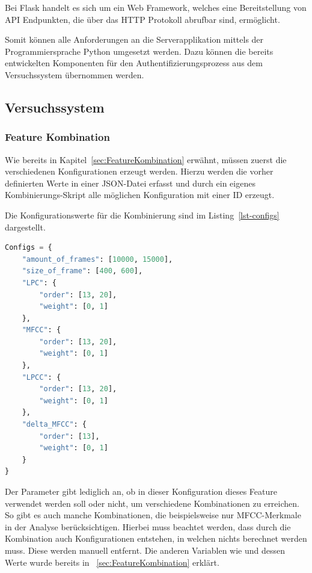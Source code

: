 Bei Flask handelt es sich um ein Web Framework, welches eine Bereitstellung von \ac{API} Endpunkten, die über das \ac{HTTP} Protokoll abrufbar sind, ermöglicht.

Somit können alle Anforderungen an die Serverapplikation mittels der Programmiersprache Python umgesetzt werden.
Dazu können die bereits entwickelten Komponenten für den Authentifizierungsprozess aus dem Versuchssystem übernommen werden.

\subsection{Versuchssystem}\label{sec:UmsetzungVersuchssystem}

\subsubsection{Feature Kombination}

Wie bereits in Kapitel~\ref{sec:FeatureKombination} erwähnt, müssen zuerst die verschiedenen Konfigurationen erzeugt werden.
Hierzu werden die vorher definierten Werte in einer JSON-Datei erfasst und durch ein eigenes Kombinierungs-Skript alle möglichen Konfiguration mit einer ID erzeugt.

Die Konfigurationswerte für die Kombinierung sind im Listing~\ref{lst-configs} dargestellt.

\begin{lstlisting}[language=Python,numbers=none,caption=Konfigurationsmöglichkeiten,label=lst-configs]
Configs = {
    "amount_of_frames": [10000, 15000],
    "size_of_frame": [400, 600],
    "LPC": {
        "order": [13, 20],
        "weight": [0, 1]
    },
    "MFCC": {
        "order": [13, 20],
        "weight": [0, 1]
    },
    "LPCC": {
        "order": [13, 20],
        "weight": [0, 1]
    },
    "delta_MFCC": {
        "order": [13],
        "weight": [0, 1]
    }
}
\end{lstlisting}

Der  Parameter gibt lediglich an, ob in dieser Konfiguration dieses Feature verwendet werden soll oder nicht, um verschiedene Kombinationen zu erreichen.
So gibt es auch manche Kombinationen, die beispielsweise nur \ac{MFCC}-Merkmale in der Analyse berücksichtigen.
Hierbei muss beachtet werden, dass durch die Kombination auch Konfigurationen entstehen, in welchen nichts berechnet werden muss.
Diese werden manuell entfernt.
Die anderen Variablen wie  und dessen Werte wurde bereits in ~\ref{sec:FeatureKombination} erklärt.

